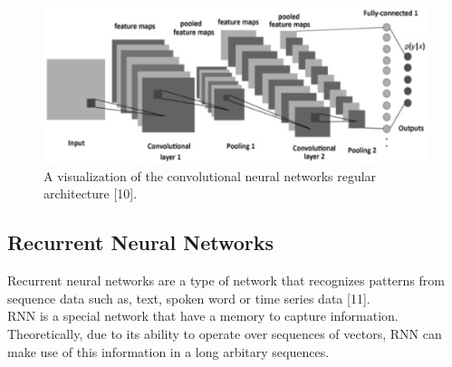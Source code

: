 \begin{figure}[ht]
\centering
\includegraphics{Figures/cnn}
\decoRule
\caption[A visualization of the convolutional neural networks regular architecture “10”]{A visualization of the convolutional neural networks regular architecture [10].}
\label{fig:la}
\end{figure}
\newpage
\subsection{Recurrent Neural Networks}
\hspace{5mm} Recurrent neural networks are a type of network that recognizes patterns from sequence data such as, text, spoken word or time series data [11].\\

RNN is a special network that have a memory to capture information. Theoretically, due to its ability to operate over sequences of vectors, RNN can make use of this information in a long arbitary sequences.\\

